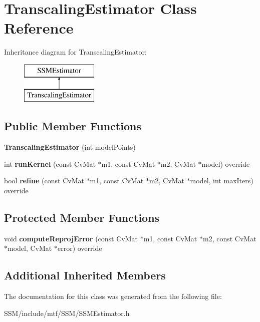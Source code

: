 \hypertarget{classTranscalingEstimator}{\section{Transcaling\-Estimator Class Reference}
\label{classTranscalingEstimator}
}
Inheritance diagram for Transcaling\-Estimator\-:\begin{figure}[H]
\begin{center}
\leavevmode
\includegraphics[height=2.000000cm]{classTranscalingEstimator}
\end{center}
\end{figure}
\subsection*{Public Member Functions}
\begin{DoxyCompactItemize}
\item 
\hypertarget{classTranscalingEstimator_a81ff09c1b39c0a939c9cd8a6c41be976}{{\bfseries Transcaling\-Estimator} (int model\-Points)}\label{classTranscalingEstimator_a81ff09c1b39c0a939c9cd8a6c41be976}

\item 
\hypertarget{classTranscalingEstimator_ae3d60ca9fc08053f3ad442906d8b5684}{int {\bfseries run\-Kernel} (const Cv\-Mat $\ast$m1, const Cv\-Mat $\ast$m2, Cv\-Mat $\ast$model) override}\label{classTranscalingEstimator_ae3d60ca9fc08053f3ad442906d8b5684}

\item 
\hypertarget{classTranscalingEstimator_a4be4855c6a4409652bfc9ead521c61d1}{bool {\bfseries refine} (const Cv\-Mat $\ast$m1, const Cv\-Mat $\ast$m2, Cv\-Mat $\ast$model, int max\-Iters) override}\label{classTranscalingEstimator_a4be4855c6a4409652bfc9ead521c61d1}

\end{DoxyCompactItemize}
\subsection*{Protected Member Functions}
\begin{DoxyCompactItemize}
\item 
\hypertarget{classTranscalingEstimator_a2fda1520db7e4fe5476db3895afc1bfc}{void {\bfseries compute\-Reproj\-Error} (const Cv\-Mat $\ast$m1, const Cv\-Mat $\ast$m2, const Cv\-Mat $\ast$model, Cv\-Mat $\ast$error) override}\label{classTranscalingEstimator_a2fda1520db7e4fe5476db3895afc1bfc}

\end{DoxyCompactItemize}
\subsection*{Additional Inherited Members}


The documentation for this class was generated from the following file\-:\begin{DoxyCompactItemize}
\item 
S\-S\-M/include/mtf/\-S\-S\-M/S\-S\-M\-Estimator.\-h\end{DoxyCompactItemize}
